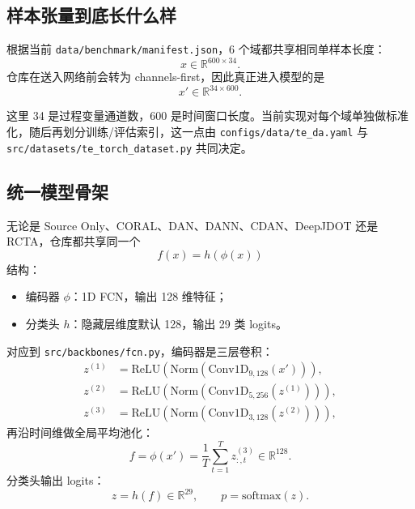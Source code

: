 \documentclass[12pt,a4paper]{ctexart}
\newcommand{\R}{\mathbb{R}}
\newcommand{\softmax}{\mathrm{softmax}}
\begin{document}
\subsection{样本张量到底长什么样}

根据当前 \texttt{data/benchmark/manifest.json}，6 个域都共享相同单样本长度：
\begin{equation}
x \in \R^{600\times 34}.
\end{equation}
仓库在送入网络前会转为 channels-first，因此真正进入模型的是
\begin{equation}
x' \in \R^{34\times 600}.
\end{equation}

这里 34 是过程变量通道数，600 是时间窗口长度。当前实现对每个域单独做标准化，随后再划分训练/评估索引，这一点由 \nolinkurl{configs/data/te_da.yaml} 与 \nolinkurl{src/datasets/te_torch_dataset.py} 共同决定。

\subsection{统一模型骨架}

无论是 Source Only、CORAL、DAN、DANN、CDAN、DeepJDOT 还是 RCTA，仓库都共享同一个
\begin{equation}
f(x)=h(\phi(x))
\end{equation}
结构：
\begin{itemize}[leftmargin=2em]
  \item 编码器 $\phi$：1D FCN，输出 128 维特征；
  \item 分类头 $h$：隐藏层维度默认 128，输出 29 类 logits。
\end{itemize}

对应到 \texttt{src/backbones/fcn.py}，编码器是三层卷积：
\begin{align}
z^{(1)} &= \mathrm{ReLU}(\mathrm{Norm}(\mathrm{Conv1D}_{9,128}(x'))),\\
z^{(2)} &= \mathrm{ReLU}(\mathrm{Norm}(\mathrm{Conv1D}_{5,256}(z^{(1)}))),\\
z^{(3)} &= \mathrm{ReLU}(\mathrm{Norm}(\mathrm{Conv1D}_{3,128}(z^{(2)}))),
\end{align}
再沿时间维做全局平均池化：
\begin{equation}
f=\phi(x')=\frac{1}{T}\sum_{t=1}^{T} z^{(3)}_{:,t}\in \R^{128}.
\end{equation}
分类头输出 logits：
\begin{equation}
z=h(f)\in \R^{29}, \qquad p=\softmax(z).
\end{equation}
\end{document}

